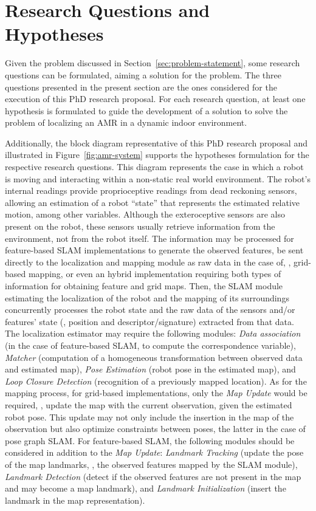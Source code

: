 \section{Research Questions and Hypotheses}\label{sec:hypotheses}

Given the problem discussed in Section~\ref{sec:problem-statement}, some research questions can be formulated, aiming a solution for the problem. The three questions presented in the present section are the ones considered for the execution of this PhD research proposal. For each research question, at least one hypothesis is formulated to guide the development of a solution to solve the problem of localizing an \gls{AMR} in a dynamic indoor environment.

Additionally, the block diagram representative of this PhD research proposal and illustrated in Figure~\ref{fig:amr-system} supports the hypotheses formulation for the respective research questions. This diagram represents the case in which a robot is moving and interacting within a non-static real world environment. The robot's internal readings provide proprioceptive readings from dead reckoning sensors, allowing an estimation of a robot ``state'' that represents the estimated relative motion, among other variables. Although the exteroceptive sensors are also present on the robot, these sensors usually retrieve information from the environment, not from the robot itself. The information may be processed for feature-based \gls{SLAM} implementations to generate the observed features, be sent directly to the localization and mapping module as raw data in the case of, \eg, grid-based mapping, or even an hybrid implementation requiring both types of information for obtaining feature and grid maps.
Then, the \gls{SLAM} module estimating the localization of the robot and the mapping of its surroundings concurrently processes the robot state and the raw data of the sensors and/or features' state (\eg, position and descriptor/signature) extracted from that data.
The localization estimator may require the following modules: \textit{Data association} (in the case of feature-based \gls{SLAM}, to compute the correspondence variable), \textit{Matcher} (computation of a homogeneous transformation between observed data and estimated map), \textit{Pose Estimation} (robot pose in the estimated map), and \textit{Loop Closure Detection} (recognition of a previously mapped location). As for the mapping process, for grid-based implementations, only the \textit{Map Update} would be required, \ie, update the map with the current observation, given the estimated robot pose. This update may not only include the insertion in the map of the observation but also optimize constraints between poses, the latter in the case of pose graph \gls{SLAM}. For feature-based \gls{SLAM}, the following modules should be considered in addition to the \textit{Map Update}: \textit{Landmark Tracking} (update the pose of the map landmarks, \ie, the observed features mapped by the \gls{SLAM} module), \textit{Landmark Detection} (detect if the observed features are not present in the map and may become a map landmark), and \textit{Landmark Initialization} (insert the landmark in the map representation).
